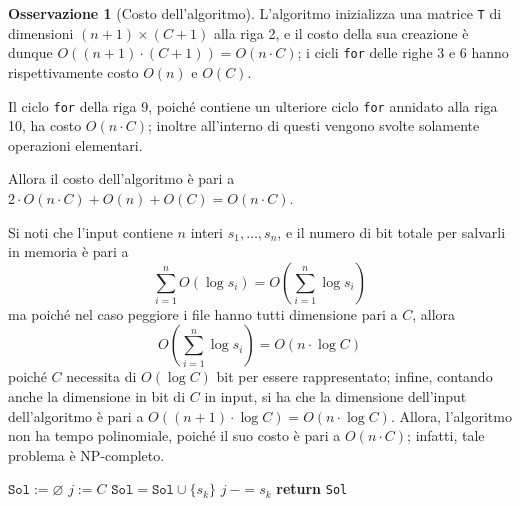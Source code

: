 \documentclass[14pt]{extreport}
\theoremstyle{definition}
\theoremstyle{definition}
\newtheorem{remark}{Osservazione}[subsection]
\begin{document}
\begin{remark}[Costo dell'algoritmo]
    L'algoritmo inizializza una matrice \texttt{T} di dimensioni $(n + 1) \times (C + 1)$ alla riga 2, e il costo della sua creazione è dunque $O((n + 1) \cdot (C + 1)) = O(n \cdot C)$; i cicli \texttt{for} delle righe 3 e 6 hanno rispettivamente costo $O(n)$ e $O(C)$.

    Il ciclo \texttt{for} della riga 9, poiché contiene un ulteriore ciclo \texttt{for} annidato alla riga 10, ha costo $O(n \cdot C)$; inoltre all'interno di questi vengono svolte solamente operazioni elementari.

    Allora il costo dell'algoritmo è pari a $2 \cdot O(n \cdot C) + O(n) + O(C) = O(n \cdot C)$.

    Si noti che l'input contiene $n$ interi $s_1, \ldots, s_n$, e il numero di bit totale per salvarli in memoria è pari a $$\displaystyle \sum_{i = 1}^n{O(\log s_i)} = O \left ( \sum_{i = 1}^n{\log s_i} \right )$$ ma poiché nel caso peggiore i file hanno tutti dimensione pari a $C$, allora $$O \left ( \sum_{i = 1}^n{\log s_i} \right ) = O(n \cdot \log C)$$ poiché $C$ necessita di $O(\log C)$ bit per essere rappresentato; infine, contando anche la dimensione in bit di $C$ in input, si ha che la dimensione dell'input dell'algoritmo è pari a $O((n + 1) \cdot \log C) = O(n \cdot \log C)$. Allora, l'algoritmo non ha tempo polinomiale, poiché il suo costo è pari a $O(n \cdot C)$; infatti, tale problema è NP-completo.
\end{remark}

\begin{algorithm}[H]
    \caption{
        Data una lista \texttt{S} di dimensioni di $n$ file, una memoria di capacità $C$, e la matrice costruita attraverso la funzione \texttt{fileAllocation} dell'\cref{fileallocation}, l'algoritmo restituisce un insieme di file che massimizza la memoria allocata; inoltre, i file hanno tutti dimensione inferiore a $C$.\\
        \textbf{Input}: \texttt{S} lista di dimensioni di file; $C$ capacità della memoria, tale che $\forall s_i \in \texttt{S} \quad s_i \le C$; \texttt{T} matrice prodotta precedentemente.\\
        \textbf{Output}: un insieme di file che massimizza la memoria allocata.
    }

    \begin{algorithmic}[1]
        \label{fileallocation2}
            \State $\texttt{Sol} := \varnothing$
            \State $j:= C$
             
                    \State $\texttt{Sol} = \texttt{Sol} \cup \{s_k\}$
                    \State $j \ -= s_k$
                \EndIf
            \EndFor
            \State \textbf{return} \texttt{Sol}
        \EndFunction
    \end{algorithmic}
\end{algorithm}
\end{document}
